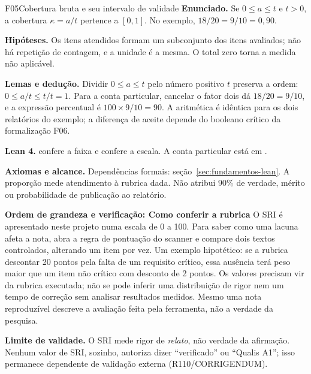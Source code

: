 \begin{formalizacao}{F05}{Cobertura bruta e seu intervalo de validade}
\textbf{Enunciado.} Se $0\leq a\leq t$ e $t>0$, a cobertura $\kappa=a/t$ pertence a $[0,1]$. No exemplo, $18/20=9/10=0{,}90$.

\textbf{Hipóteses.} Os itens atendidos formam um subconjunto dos itens avaliados; não há repetição de contagem, e a unidade é a mesma. O total zero torna a medida não aplicável.

\textbf{Lemas e dedução.} Dividir $0\leq a\leq t$ pelo número positivo $t$ preserva a ordem: $0\leq a/t\leq t/t=1$. Para a conta particular, cancelar o fator dois dá $18/20=9/10$, e a expressão percentual é $100\times9/10=90$. A aritmética é idêntica para os dois relatórios do exemplo; a diferença de aceite depende do booleano crítico da formalização F06.

\textbf{Lean 4.}  confere a faixa e  confere a escala. A conta particular está em .

\textbf{Axiomas e alcance.} Dependências formais: seção~\ref{sec:fundamentos-lean}. A proporção mede atendimento à rubrica dada. Não atribui $90\%$ de verdade, mérito ou probabilidade de publicação ao relatório.
\end{formalizacao}

\begin{resultado}
\textbf{Ordem de grandeza e verificação: Como conferir a rubrica} O SRI é apresentado neste projeto numa escala
de 0 a 100. Para saber como uma lacuna afeta a nota, abra a regra de pontuação do
scanner e compare dois textos controlados, alterando um item por vez. Um exemplo
hipotético: se a rubrica descontar 20 pontos pela falta de um requisito crítico,
essa ausência terá peso maior que um item não crítico com desconto de 2 pontos.
Os valores precisam vir da rubrica executada; não se pode inferir uma distribuição
de rigor nem um tempo de correção sem analisar resultados medidos. Mesmo uma nota
reproduzível descreve a avaliação feita pela ferramenta, não a verdade da pesquisa.
\end{resultado}

\begin{aviso}
\textbf{Limite de validade.} O SRI mede rigor de \emph{relato}, não verdade da
afirmação. Nenhum valor de SRI, sozinho, autoriza dizer ``verificado'' ou ``Qualis
A1''; isso permanece dependente de validação externa (R110/CORRIGENDUM).
\end{aviso}

